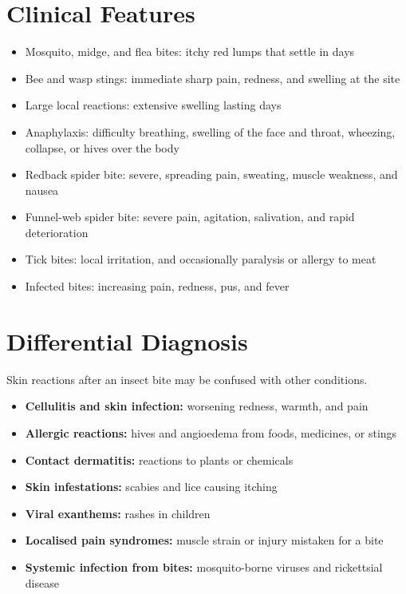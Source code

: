 \section*{Clinical Features}
\begin{itemize}
    \item Mosquito, midge, and flea bites: itchy red lumps that settle in days
    \item Bee and wasp stings: immediate sharp pain, redness, and swelling at the site
    \item Large local reactions: extensive swelling lasting days
    \item Anaphylaxis: difficulty breathing, swelling of the face and throat, wheezing, collapse, or hives over the body
    \item Redback spider bite: severe, spreading pain, sweating, muscle weakness, and nausea
    \item Funnel-web spider bite: severe pain, agitation, salivation, and rapid deterioration
    \item Tick bites: local irritation, and occasionally paralysis or allergy to meat
    \item Infected bites: increasing pain, redness, pus, and fever
\end{itemize}

\section*{Differential Diagnosis}
Skin reactions after an insect bite may be confused with other conditions.
\begin{itemize}
    \item \textbf{Cellulitis and skin infection:} worsening redness, warmth, and pain
    \item \textbf{Allergic reactions:} hives and angioedema from foods, medicines, or stings
    \item \textbf{Contact dermatitis:} reactions to plants or chemicals
    \item \textbf{Skin infestations:} scabies and lice causing itching
    \item \textbf{Viral exanthems:} rashes in children
    \item \textbf{Localised pain syndromes:} muscle strain or injury mistaken for a bite
    \item \textbf{Systemic infection from bites:} mosquito-borne viruses and rickettsial disease
\end{itemize}

